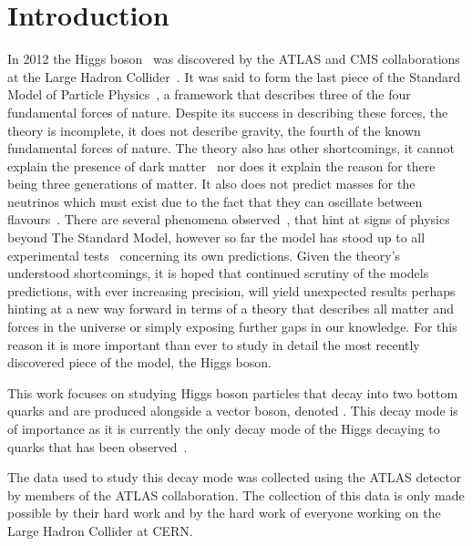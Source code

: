 \chapter{Introduction}%
\label{ch:intro}

In 2012 the Higgs boson~\cite{Brout-Englert, Higgs:1964, Kibble} was discovered
by the ATLAS and CMS collaborations at the Large Hadron
Collider~\cite{DiscoHiggsATLAS, DiscoHiggsCMS}. It was said to form the last
piece of the Standard Model of Particle Physics~\cite{Glashow1959, Salam:1968,
Weinberg:1967, GellMann:1962}, a framework that describes three of the four
fundamental forces of nature. Despite its success in describing these forces,
the theory is incomplete, it does not describe gravity, the fourth of the known
fundamental forces of nature. The theory also has other shortcomings, it cannot
explain the presence of dark matter~\cite{DM-ev-sloan, DM-ev-nucleosynth,
  DM-ev-supernova, DM-ev-scaffold, DM-ev-direct, DM-ev-strong-lens,
  DM-ev-candidates, DM-ev-PDG, DM-ev-Zwicky, DM-ev-nonbaryonic, DM-ev-particle}
nor does it explain the reason for there being three generations of matter. It
also does not predict masses for the neutrinos which must exist due to the fact
that they can oscillate between flavours~\cite{nu-osc-1, nu-osc-2, nu-osc-3}.
There are several phenomena observed~\cite{anom-BD-branching, anom-Dtau-excess,
  anom-g-2, anom-proton-radius, anom-bsll-trans}, that hint at signs of physics
beyond The Standard Model, however so far the model has stood up to all
experimental tests~\cite{EWtests, 1998-SMtests} concerning its own predictions.
Given the theory's understood shortcomings, it is hoped that continued
scrutiny of the models predictions, with ever increasing precision, will yield
unexpected results perhaps hinting at a new way forward in terms of a theory
that describes all matter and forces in the universe or simply exposing further
gaps in our knowledge. For this reason it is more important than ever to study
in detail the most recently discovered piece of the model, the Higgs boson.

This work focuses on studying Higgs boson particles that decay into two bottom
quarks and are produced alongside a vector boson, denoted \VHbb. This decay mode
is of importance as it is currently the only decay mode of the Higgs decaying to
quarks that has been observed~\cite{vhbb-obs}.

The data used to study this decay mode was collected using the ATLAS detector by
members of the ATLAS collaboration. The collection of this data is only made
possible by their hard work and by the hard work of everyone working on the
Large Hadron Collider at CERN.

